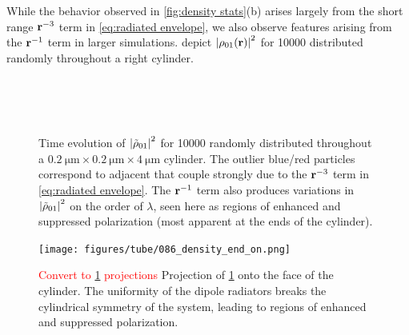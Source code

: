 While the behavior observed in \cref{fig:density stats}(b) arises largely from the short range $\vb{r}^{-3}$ term in \cref{eq:radiated envelope}, we also observe features arising from the $\vb{r}^{-1}$ term in larger simulations.
 depict $\abs{\rho_{01}(\vb{r})}^2$ for \num{10000} \qds{} distributed randomly throughout a right cylinder.


\begin{figure}
  \centering
   \\
   \\
   \\
  \caption{\label{fig:tubes}
    Time evolution of $\abs{\tilde{\rho}_{01}}^2$ for \num{10000} \qds{} randomly distributed throughout a $\SI{0.2}{\micro\meter} \times \SI{0.2}{\micro\meter} \times \SI{4}{\micro\meter}$ cylinder.
    The outlier blue/red particles correspond to adjacent \qds{} that couple strongly due to the $\vb{r}^{-3}$ term in \cref{eq:radiated envelope}.
    The $\vb{r}^{-1}$ term also produces variations in $\abs{\tilde{\rho}_{01}}^2$ on the order of $\lambda$, seen here as regions of enhanced and suppressed polarization (most apparent at the ends of the cylinder).
  }
\end{figure}

\begin{figure}
  \centering
  \texttt{[image: figures/tube/086\_density\_end\_on.png]}
  \caption{\label{fig:xy tube projection}
    \textcolor{red}{Convert to \cref{fig:tubes} projections} Projection of \cref{fig:tubes} onto the face of the cylinder.
    The uniformity of the dipole radiators breaks the cylindrical symmetry of the system, leading to regions of enhanced and suppressed polarization.
  }
\end{figure}

